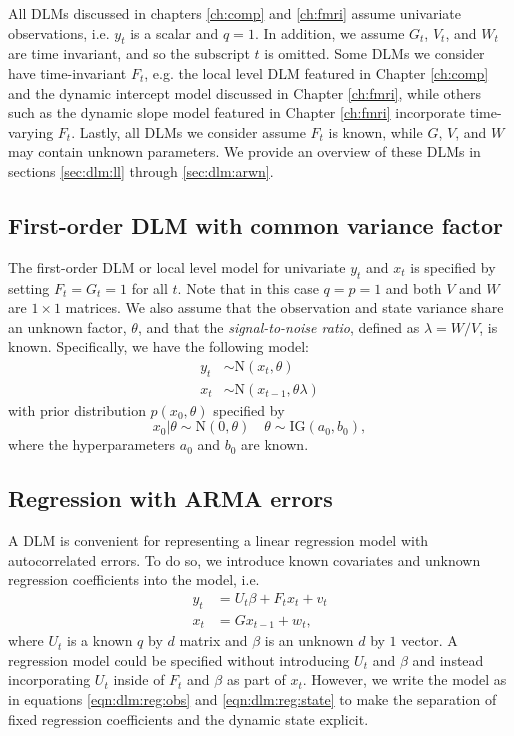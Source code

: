 All DLMs discussed in chapters \ref{ch:comp} and \ref{ch:fmri} assume univariate observations, i.e. $y_t$ is a scalar and $q = 1$. In addition, we assume $G_t$, $V_t$, and $W_t$ are time invariant, and so the subscript $t$ is omitted. Some DLMs we consider have time-invariant $F_t$, e.g. the local level DLM featured in Chapter \ref{ch:comp} and the dynamic intercept model discussed in Chapter \ref{ch:fmri}, while others such as the dynamic slope model featured in Chapter \ref{ch:fmri} incorporate time-varying $F_t$. Lastly, all DLMs we consider assume $F_t$ is known, while $G$, $V$, and $W$ may contain unknown parameters. We provide an overview of these DLMs in sections \ref{sec:dlm:ll} through \ref{sec:dlm:arwn}.

\subsection{First-order DLM with common variance factor \label{sec:dlm:ll}}

The first-order DLM or local level model for univariate $y_t$ and $x_t$ is specified by setting $F_t = G_t = 1$ for all $t$. Note that in this case $q = p = 1$ and both $V$ and $W$ are $1 \times 1$ matrices. We also assume that the observation and state variance share an unknown factor, $\theta$, and that the \emph{signal-to-noise ratio}, defined as $\lambda = W / V$, is known. Specifically, we have the following model:
\begin{align}
y_t &\sim \mbox{N}(x_t, \theta) \label{eqn:ll:obs} \\
x_t &\sim \mbox{N}(x_{t-1}, \theta\lambda) \label{eqn:ll:state}
\end{align}
with prior distribution $p(x_0, \theta)$ specified by
\begin{equation}
x_0|\theta \sim \mbox{N}(0, \theta) \quad \theta \sim \mbox{IG}(a_0,b_0), \label{eqn:ll:prior}
\end{equation}
where the hyperparameters $a_0$ and $b_0$ are known.

\subsection{Regression with ARMA errors \label{sec:dlm:arma}}

A DLM is convenient for representing a linear regression model with autocorrelated errors. To do so, we introduce known covariates and unknown regression coefficients into the model, i.e.
\begin{align}
y_t &= U_t\beta + F_tx_t + v_t \label{eqn:dlm:reg:obs} \\
x_t &= Gx_{t-1} + w_t, \label{eqn:dlm:reg:state}
\end{align}
where $U_t$ is a known $q$ by $d$ matrix and $\beta$ is an unknown $d$ by $1$ vector. A regression model could be specified without introducing $U_t$ and $\beta$ and instead incorporating $U_t$ inside of $F_t$ and $\beta$ as part of $x_t$. However, we write the model as in equations \eqref{eqn:dlm:reg:obs} and \eqref{eqn:dlm:reg:state} to make the separation of fixed regression coefficients and the dynamic state explicit.

